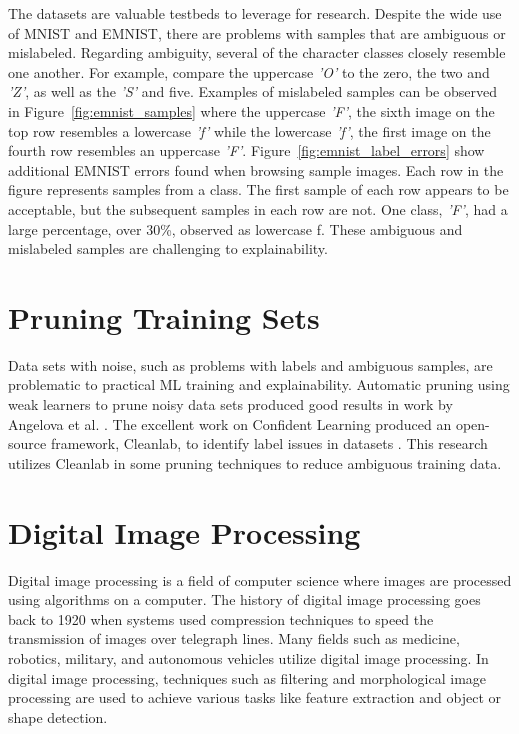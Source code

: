 The datasets are valuable testbeds to leverage for research. Despite the wide
use of MNIST and EMNIST, there are problems with samples that are ambiguous or
mislabeled. Regarding ambiguity, several of the character classes closely
resemble one another. For example, compare the uppercase \textit{'O'} to the
zero, the two and \textit{'Z'}, as well as the \textit{'S'} and five. Examples
of mislabeled samples can be observed in Figure~\ref{fig:emnist_samples} where the
uppercase \textit{'F'}, the sixth image on the top row resembles a lowercase
\textit{'f'} while the lowercase \textit{'f'}, the first image on the fourth row
resembles an uppercase \textit{'F'}. Figure~\ref{fig:emnist_label_errors} show
additional EMNIST errors found when browsing sample images. Each row in the
figure represents samples from a class. The first sample of each row appears to
be acceptable, but the subsequent samples in each row are not. One class,
\textit{'F'}, had a large percentage, over 30\%, observed as lowercase f. These
ambiguous and mislabeled samples are challenging to explainability.


\section{Pruning Training Sets}

Data sets with noise, such as problems with labels and ambiguous samples, are
problematic to practical ML training and explainability. Automatic pruning using
weak learners to prune noisy data sets produced good results in work by
Angelova et al. \cite{angelova05}. The excellent work on Confident Learning
produced an open-source framework, Cleanlab, to identify label issues in
datasets \cite{northcutt2021}. This research utilizes Cleanlab in some pruning
techniques to reduce ambiguous training data.


\section{Digital Image Processing}

Digital image processing is a field of computer science where images are
processed using algorithms on a computer. The history of digital image
processing goes back to 1920 when systems used compression techniques to speed
the transmission of images over telegraph lines. Many fields such as medicine,
robotics, military, and autonomous vehicles utilize digital image
processing\cite{gonzalez2018image}. In digital image processing, techniques such
as filtering and morphological image processing are used to achieve various
tasks like feature extraction and object or shape detection.

